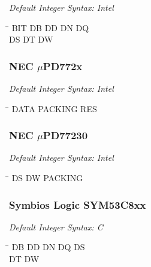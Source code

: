 {\em Default Integer Syntax: Intel}

{\tt\begin{tabbing}
\hspace{3cm}\=\hspace{3cm}\=\hspace{3cm}\=\hspace{3cm}\=\kill
BIT        \> DB         \> DD          \> DN          \> DQ \\
DS         \> DT         \> DW \\
\end{tabbing}}

\subsubsection{NEC $\mu$PD772x}

{\em Default Integer Syntax: Intel}

{\tt\begin{tabbing}
\hspace{3cm}\=\hspace{3cm}\=\hspace{3cm}\=\hspace{3cm}\=\kill
DATA       \> PACKING     \> RES \\
\end{tabbing}}

\subsubsection{NEC $\mu$PD77230}

{\em Default Integer Syntax: Intel}

{\tt\begin{tabbing} 
\hspace{3cm}\=\hspace{3cm}\=\hspace{3cm}\=\hspace{3cm}\=\kill
DS         \> DW          \> PACKING \\
\end{tabbing}}

\subsubsection{Symbios Logic SYM53C8xx}

{\em Default Integer Syntax: C}

{\tt\begin{tabbing} 
\hspace{3cm}\=\hspace{3cm}\=\hspace{3cm}\=\hspace{3cm}\=\kill
DB         \> DD          \> DN          \> DQ          \> DS \\
DT         \> DW \\
\end{tabbing}}

